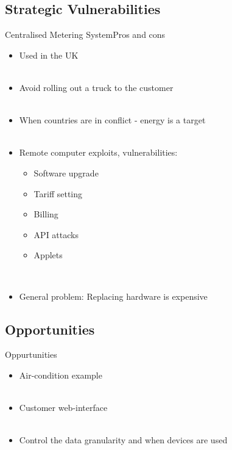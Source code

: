 \documentclass[10pt]{beamer}
\begin{document}
\subsection{Strategic Vulnerabilities}
\begin{frame}{Centralised Metering System}{Pros and cons}
\begin{itemize}
	\item Used in the UK
	\\~\\
	\item Avoid rolling out a truck to the customer
	\\~\\
	\item When countries are in conflict - energy is a target
	\\~\\
	\item Remote computer exploits, vulnerabilities:
	\begin{itemize}
		\item Software upgrade
		\item Tariff setting
		\item Billing
		\item API attacks
		\item Applets
	\end{itemize}
	~\\
	\item General problem: Replacing hardware is expensive
\end{itemize}
\end{frame}


\subsection{Opportunities}
\begin{frame}{Oppurtunities}
	\begin{itemize}
		\item Air-condition example
		\\~\\
		\item Customer web-interface
		\\~\\
		\item Control the data granularity and when devices are used
	\end{itemize}
\end{frame}
\end{document}
